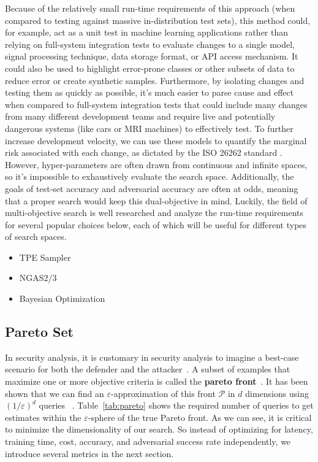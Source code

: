 \documentclass[conference]{IEEEtran}
\begin{document}
Because of the relatively small run-time requirements of this approach (when compared to testing against massive in-distribution test sets), this method could, for example, act as a unit test in machine learning applications rather than relying on full-system integration tests to evaluate changes to a single model, signal processing technique, data storage format, or API access mechanism. It could also be used to highlight error-prone classes or other subsets of data to reduce error or create synthetic samples. Furthermore, by isolating changes and testing them as quickly as possible, it's much easier to parse cause and effect when compared to full-system integration tests that could include many changes from many different development teams and require live and potentially dangerous systems (like cars or MRI machines) to effectively test. To further increase development velocity, we can use these models to quantify the marginal risk associated with each change, as dictated by the ISO 26262 standard \cite{iso26262}. However, hyper-parameters are often drawn from continuous and infinite spaces, so it's impossible to exhaustively evaluate the search space. Additionally, the goals of test-set accuracy and adversarial accuracy are often at odds, meaning that a proper search would keep this dual-objective in mind. Luckily, the field of multi-objective search is well researched and analyze the run-time requirements for several popular choices below, each of which will be useful for different types of search spaces.

\begin{itemize}
    \item TPE Sampler
    \item NGAS2/3
    \item Bayesian Optimization
\end{itemize}


\subsection{Pareto Set}
In security analysis, it is customary in security analysis to imagine a best-case scenario for both the defender and the attacker~\cite{}. A subset of examples that maximize one or more objective criteria is called the \textbf{pareto front}~\cite{zitzler2008quality}. It has been shown that we can find an $\varepsilon$-approximation of this front $\mathcal{P}$ in $d$ dimensions using $(1/ \varepsilon)^d$ queries ~\cite{legriel2010approximating}. Table~\ref{tab:pareto} shows the required number of queries to get estimates within the $\varepsilon$-sphere of the true Pareto front. As we can see, it is critical to minimize the dimensionality of our search. So instead of optimizing for latency, training time, cost, accuracy, and adversarial success rate independently, we introduce several metrics in the next section.
\end{document}
